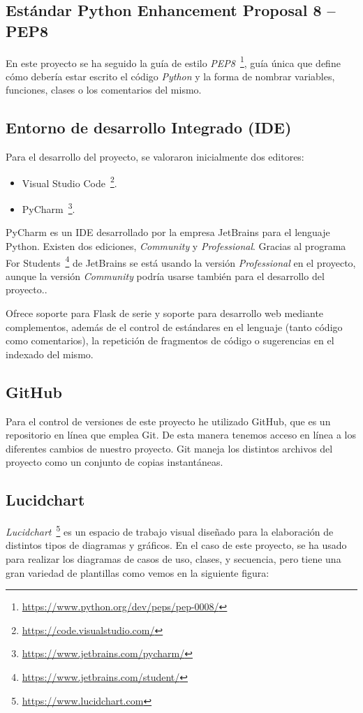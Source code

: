 \subsection{Estándar Python Enhancement Proposal 8 -- PEP8}
En este proyecto se ha seguido la guía de estilo \textit{PEP8}~\footnote{\url{https://www.python.org/dev/peps/pep-0008/}}, guía única que define cómo debería estar escrito el código \textit{Python} y la forma de nombrar variables, funciones, clases o los comentarios del mismo.


\subsection{Entorno de desarrollo Integrado (IDE)}
Para el desarrollo del proyecto, se valoraron inicialmente dos editores:
\begin{itemize}	
	\item Visual Studio Code~\footnote{\url{https://code.visualstudio.com/}}.
	\item PyCharm~\footnote{\url{https://www.jetbrains.com/pycharm/}}.
\end{itemize}

PyCharm es un IDE desarrollado por la empresa JetBrains para el lenguaje Python. Existen dos ediciones, \textit{Community} y \textit{Professional}. Gracias al programa For Students~\footnote{\url{https://www.jetbrains.com/student/}} de JetBrains se está usando la versión \textit{Professional} en el proyecto, aunque la versión \textit{Community} podría usarse también para el desarrollo del proyecto..

Ofrece soporte para Flask de serie y soporte para desarrollo web mediante complementos, además de el control de estándares en el lenguaje (tanto código como comentarios), la repetición de fragmentos de código o sugerencias en el indexado del mismo.



\subsection{GitHub}
Para el control de versiones de este proyecto he utilizado GitHub, que es un repositorio en línea que emplea Git. De esta manera tenemos acceso en línea a los diferentes cambios de nuestro proyecto.
Git maneja los distintos archivos del proyecto como un conjunto de copias instantáneas.

\subsection{Lucidchart}
\textit{Lucidchart}~\footnote{\url{https://www.lucidchart.com}} es un espacio de trabajo visual diseñado para la elaboración de distintos tipos de diagramas y gráficos. En el caso de este proyecto, se ha usado para realizar los diagramas de casos de uso, clases, y secuencia, pero tiene una gran variedad de plantillas como vemos en la siguiente figura:

